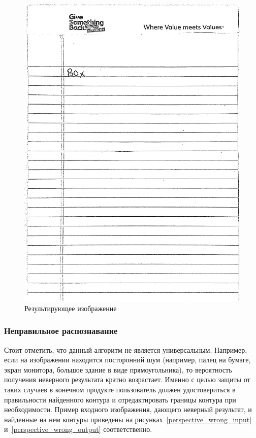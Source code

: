 \begin{figure}
    \includegraphics[scale=0.05]{img/perspective/output.JPG}
    \caption{Результирующее изображение}
    \label{preprocess_out}
\end{figure}

\subsubsection{Неправильное распознавание}
Стоит отметить, что данный алгоритм не является универсальным. Например, если на изображении находится посторонний шум (например, палец на бумаге, экран монитора, большое здание в виде прямоугольника), 
то вероятность получения неверного результата кратно возрастает. Именно с целью защиты от таких случаев в конечном продукте пользователь должен удостовериться в правильности найденного контура и отредактировать границы контура при необходимости.
Пример входного изображения, дающего неверный результат, и найденные на нем контуры приведены на рисунках~\ref{perspective_wrong_input} и~\ref{perspective_wrong_output} соответственно.

